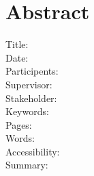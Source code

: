 
\section{Abstract}

Title:
\\
Date:
\\
Participents:
\\
Supervisor:
\\
Stakeholder:
\\
Keywords:
\\
Pages:
\\
Words:
\\
Accessibility:
\\
Summary:
\newpage